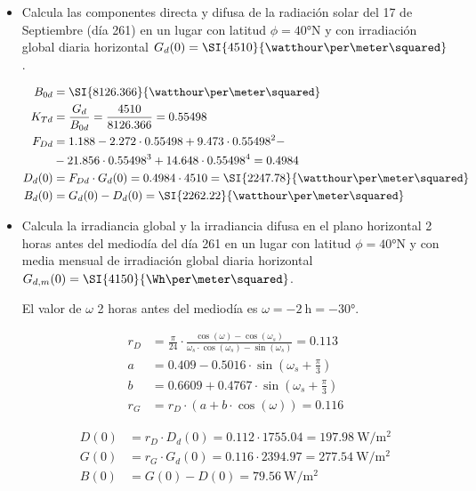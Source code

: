 \begin{itemize}
\item Calcula las componentes directa y difusa de la radiación solar
  del 17 de Septiembre (día 261) en un lugar con latitud
  $\phi=\ang{40}\mathrm{N}$ y con irradiación global diaria horizontal
  $G_d(0)=\SI{4510}{\watthour\per\meter\squared}$.

\begin{align*}
  B_{0d} &= \SI{8126.366}{\watthour\per\meter\squared}\\
  K_{Td} &= \frac{G_{d}}{B_{0d}} = \frac{4510}{8126.366} = 0.55498\\
  F_{Dd} &= 1.188 - 2.272 \cdot 0.55498 + 9.473 \cdot 0.55498^{2} -\\
         &- 21.856 \cdot 0.55498^{3} + 14.648 \cdot 0.55498^{4} = 0.4984\\
  D_d(0) &= F_{Dd} \cdot G_d(0) = 0.4984 \cdot 4510 = \SI{2247.78}{\watthour\per\meter\squared}\\
  B_d(0) &= G_d(0) - D_d(0) = \SI{2262.22}{\watthour\per\meter\squared}
\end{align*}


\item Calcula la irradiancia global y la irradiancia difusa en el
  plano horizontal 2 horas antes del mediodía del día 261 en un lugar
  con latitud $\phi=\ang{40}\mathrm{N}$ y con media mensual de
  irradiación global diaria horizontal
  $G_{d,m}(0)=\SI{4150}{\Wh\per\meter\squared}$.

  El valor de $\omega$ 2 horas antes del mediodía es
  $\omega = \SI{-2}{\hour} = \ang{-30}.$

\begin{align*}
  r_{D} &= \frac{\pi}{24}\cdot\frac{\cos(\omega)-\cos(\omega_{s})}{\omega_{s}\cdot\cos(\omega_{s})-\sin(\omega_{s})} = 0.113\\
  a &= 0.409-0.5016\cdot\sin(\omega_{s}+\frac{\pi}{3})\\
  b &= 0.6609+0.4767\cdot\sin(\omega_{s}+\frac{\pi}{3})\\
  r_{G} &= r_{D}\cdot\left(a + b\cdot\cos(\omega)\right) = 0.116
\end{align*}

\begin{align*}
  D(0) &= r_D \cdot D_{d}(0) = 0.112 \cdot 1755.04 = \SI{197.98}{\watt\per\meter\squared}\\
  G(0) &= r_G \cdot G_{d}(0) = 0.116 \cdot 2394.97 = \SI{277.54}{\watt\per\meter\squared}\\
  B(0) &= G(0) - D(0) = \SI{79.56}{\watt\per\meter\squared}
\end{align*}
\end{itemize}
